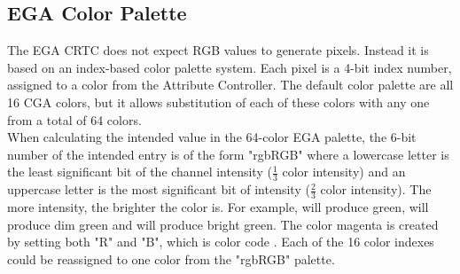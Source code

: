 \documentclass[book.tex]{subfiles}
\begin{document}
  
\subsection{EGA Color Palette}
\label{sec:ega_color_palette}
The EGA CRTC does not expect RGB values to generate pixels. Instead it is based on an index-based color palette system. Each pixel is a 4-bit index number, assigned to a color from the Attribute Controller. The default color palette are all 16 CGA colors, but it allows substitution of each of these colors with any one from a total of 64 colors.\\

When calculating the intended value in the 64-color EGA palette, the 6-bit number of the intended entry is of the form "rgbRGB" where a lowercase letter is the least significant bit of the channel intensity (\(\frac{1}{3}\) color intensity) and an uppercase letter is the most significant bit of intensity (\(\frac{2}{3}\) color intensity). The more intensity, the brighter the color is. For example,  will produce green,  will produce dim green and  will produce bright green. The color magenta is created by setting both "R" and "B", which is color code . Each of the 16 color indexes could be reassigned to one color from the "rgbRGB" palette.\\
\end{document}
